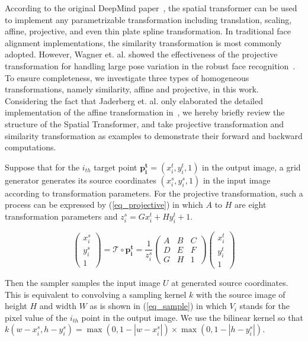 \documentclass[10pt,twocolumn,letterpaper]{article}
\begin{document}
According to the original DeepMind paper~\cite{jaderberg2015spatial}, the spatial transformer can be used to implement any parametrizable transformation including translation, scaling, affine, projective, and even thin plate spline transformation.
In traditional face alignment implementations, the similarity transformation is most commonly adopted. 
However, Wagner et. al. showed the effectiveness of the projective transformation for handling large pose variation in the robust face recognition~\cite{Wagner2012Toward}. 
To ensure completeness, we investigate three types of homogeneous transformations, namely similarity, affine and projective, in this work.
Considering the fact that Jaderberg et. al. only elaborated the detailed implementation of the affine transformation in~\cite{jaderberg2015spatial}, we hereby briefly review the structure of the Spatial Transformer, and take projective transformation and similarity transformation as examples to demonstrate their forward and backward computations.

Suppose that for the $i_{th}$ target point $\mathbf{p^t_i} = (x^t_i,y^t_i,1)$ in the output image, a grid generator generates its source coordinates $(x^s_i,y^s_i,1)$ in the input image according to transformation parameters. 
For the projective transformation, such a process can be expressed by (\ref{eq_projective}) in which $A$ to $H$ are eight transformation parameters and $z^s_i = G x^t_i + H y^t_i + 1$.

\begin{equation}\label{eq_projective}
\left(\begin{matrix}
	x^s_i\\y^s_i\\1
	\end{matrix} \right) = 
	\mathcal{T}\circ \mathbf{p^t_i} = 
	\frac{1}{z^s_i}
	\left( \begin{matrix}
	A&B&C\\D&E&F\\G&H&1
	\end{matrix} \right)
	\left(\begin{matrix}
	x^t_i\\y^t_i\\1
	\end{matrix} \right)
\end{equation}
	
Then the sampler samples the input image $U$ at generated source coordinates.
This is equivalent to convolving a sampling kernel $k$ with the source image of height $H$ and width $W$ as is shown in (\ref{eq_sample}) in which $V_i$ stands for the pixel value of the $i_{th}$ point in the output image.
We use the bilinear kernel so that $k(w-x_i^s,h-y_i^s)=\max(0,1-|w-x_i^s|) \times \max(0,1-|h-y_i^s|)$.
 
\end{document}
